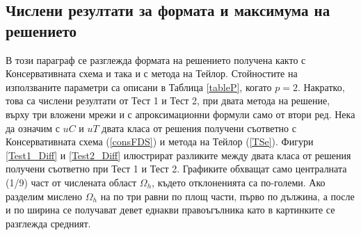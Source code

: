 \documentclass{article}
\newcommand{\rf}[1]{(\ref{#1})}
\begin{document}
\subsection{Числени резултати за формата и максимума на решението}

В този параграф се разглежда формата на решението получена както с Консервативната схема и така и с метода на Тейлор. Стойностите на използваните параметри са описани в Таблица \ref{tableP}, когато $p=2$. Накратко, това са числени резултати от Тест 1 и Тест 2, при двата метода на решение, върху три вложени мрежи и с апроксимационни формули само от втори ред. Нека да означим с $uC$ и $uT$ двата класа от решения получени съответно с Консервативната схема \rf{consFDS} и метода на Тейлор \rf{TSe}. 
Фигури \ref{Test1_Diff} и \ref{Test2_Diff} илюстрират разликите между двата класа от решения получени съответно при Тест 1 и Тест 2. Графиките обхващат само централната (1/9) част от числената област $\Omega_h$, където отклоненията са по-големи. Ако разделим мислено $\Omega_h$ на по три равни по площ части, първо по дължина, а после и по ширина се получават девет еднакви правоъгълника като в картинките се разглежда средният.
\end{document}
